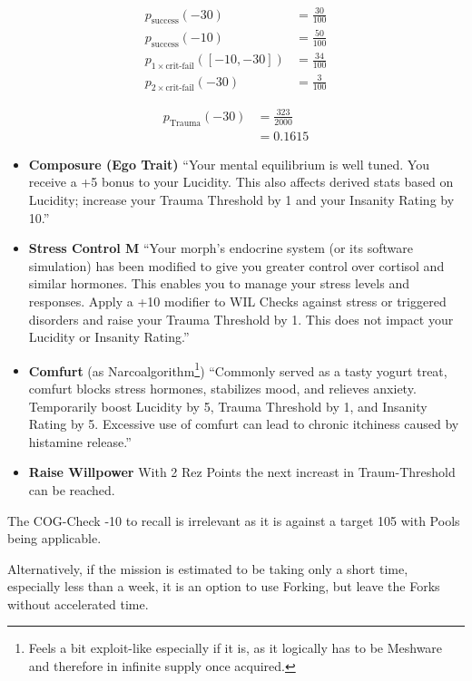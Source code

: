\begin{align}
    p_{\text{success}}(-30) &= \frac{30}{100} \\
    p_{\text{success}}(-10) &= \frac{50}{100} \\
    p_{1 \times \text{crit-fail}}(\left[-10,-30\right]) &= \frac{34}{100} \\
    p_{2 \times \text{crit-fail}}(-30) &= \frac{3}{100}
\end{align}

\begin{align}
    p_{\text{Trauma}}(-30) &= \frac{323}{2000} \\
    &= 0.1615
\end{align}

\begin{itemize}
    \item \textbf{\gls{Composure} (Ego Trait)} “Your mental equilibrium is well tuned. You receive a +5 bonus to your Lucidity. This also affects derived stats based on Lucidity; increase your Trauma Threshold by 1 and your Insanity Rating by 10.” \citep[pg. 73]{ep2e_1.1_2019}
    \item \textbf{Stress Control M} “Your morph’s endocrine system (or its software simulation) has been modified to give you greater control over cortisol and similar hormones. This enables you to manage your stress levels and responses. Apply a +10 modifier to WIL Checks against stress or triggered disorders and raise your Trauma Threshold by 1. This does not impact your Lucidity or Insanity Rating.” \citep[pg. 323]{ep2e_1.1_2019}
    \item \textbf{Comfurt} (as Narcoalgorithm\footnote{Feels a bit exploit-like especially if it is, as it logically has to be Meshware and therefore in infinite supply once acquired.}) “Commonly served as a tasty yogurt treat, comfurt blocks stress hormones, stabilizes mood, and relieves anxiety. Temporarily boost Lucidity by 5, Trauma Threshold by 1, and Insanity Rating by 5. Excessive use of comfurt can lead to chronic itchiness caused by histamine release.” \citep[pg. 332]{ep2e_1.1_2019}
    \item \textbf{Raise Willpower} With 2 Rez Points the next increast in Traum-Threshold can be reached.
\end{itemize}

The COG-Check -10 to recall is irrelevant as it is against a target 105 with Pools being applicable.

Alternatively, if the mission is estimated to be taking only a short time, especially less than a week, it is an option to use \gls{Forking}, but leave the \glspl{Fork} without accelerated time.

